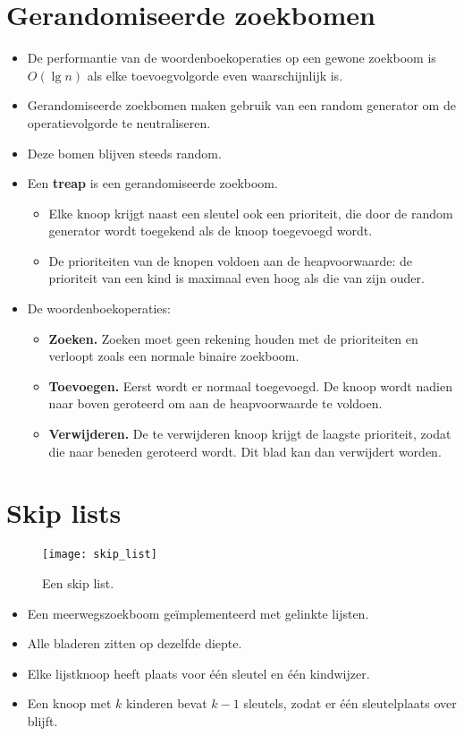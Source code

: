 \section{Gerandomiseerde zoekbomen}
\label{sec:gerandomiseerde-zoekbomen}
\begin{itemize}
    \item De performantie van de woordenboekoperaties op een gewone zoekboom is $O(\lg n)$ als elke toevoegvolgorde even waarschijnlijk is.
    \item Gerandomiseerde zoekbomen maken gebruik van een random generator om de operatievolgorde te neutraliseren.
    \item Deze bomen blijven steeds random.
    \item Een \textbf{treap} is een gerandomiseerde zoekboom.
    \begin{itemize}
        \item Elke knoop krijgt naast een sleutel ook een prioriteit, die door de random generator wordt toegekend als de knoop toegevoegd wordt.
        \item De prioriteiten van de knopen voldoen aan de heapvoorwaarde: de prioriteit van een kind is maximaal even hoog als die van zijn ouder.
    \end{itemize}
    \item De woordenboekoperaties:
    \begin{itemize}
        \item \textbf{Zoeken.}  Zoeken moet geen rekening houden met de prioriteiten en verloopt zoals een normale binaire zoekboom.
        \item \textbf{Toevoegen.} Eerst wordt er normaal toegevoegd. De knoop wordt nadien naar boven geroteerd om aan de heapvoorwaarde te voldoen.
        \item \textbf{Verwijderen.} De te verwijderen knoop krijgt de laagste prioriteit, zodat die naar beneden geroteerd wordt. Dit blad kan dan verwijdert worden.
    \end{itemize}
\end{itemize}

\section{Skip lists}
\begin{figure}[ht]
    \centering
    \texttt{[image: skip\_list]}
    \caption{Een skip list.}
    \label{fig:skip_list}
\end{figure}
\begin{itemize}
    \item Een meerwegszoekboom geïmplementeerd met gelinkte lijsten.
    \item Alle bladeren zitten op dezelfde diepte.
    \item Elke lijstknoop heeft plaats voor één sleutel en één kindwijzer.
    \item Een knoop met $k$ kinderen bevat $k-1$ sleutels, zodat er één sleutelplaats over blijft.
\end{itemize}